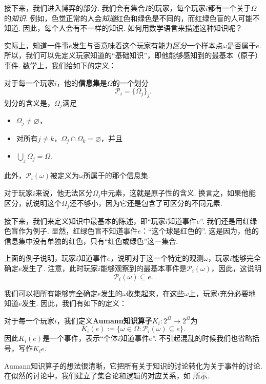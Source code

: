 接下来，我们进入博弈的部分. 我们会有集合$I$的玩家，每个玩家$i$都有一个关于$\Omega$的\textit{知识}. 例如，色觉正常的人会\textit{知道}红色和绿色是不同的，而红绿色盲的人可能不知道. 因此，每个人会有不一样的知识. 如何用数学语言来描述这种知识呢？

实际上，知道一件事$e$发生与否意味着这个玩家有能力\textit{区分}一个样本点$\omega$是否属于$e$. 所以，我们可以先定义玩家知道的“基础知识”，即他能够感知到的最基本（原子）事件. 数学上，我们给如下的定义：

\begin{definition}[信息集]
    对于每一个玩家$i$，他的\textbf{信息集}是$\Omega$的一个划分
    \[\mathcal P_i = \{\Omega_j\}_j.\]
    划分的含义是，$\Omega_j$满足
    \begin{itemize}
        \item $\Omega_j\neq \varnothing$，
        \item 对所有$j\neq k$，$\Omega_j\cap\Omega_k=\varnothing$，并且
        \item $\bigcup_j\Omega_j=\Omega$.
    \end{itemize}
    此外，$\mathcal P_i(\omega)$被定义为$\omega$所属于的那个信息集.
\end{definition}

对于玩家$i$来说，他无法区分$\Omega_j$中元素，这就是原子性的含义. 换言之，如果他能区分，就说明这个$\Omega_j$还不够小，因为它还是包含了可区分的不同元素. 

接下来，我们来定义知识中最基本的陈述，即“玩家$i$知道事件$e$”. 我们还是用红绿色盲作为例子. 显然，红绿色盲不知道事件$e$：“这个球是红色的”. 这是因为，他的信息集中没有单独的红色，只有“红色或绿色”这一集合. 

上面的例子说明，玩家$i$知道事件$e$，说明对于这一个特定的观测$\omega$，玩家$i$能够完全确定$e$发生了. 注意，此时玩家$i$能够观察到的最基本事件是$\mathcal P_i(\omega)$，因此，这说明
\[\mathcal P_i(\omega)\subseteq e.\]

我们可以把所有能够完全确定$e$发生的$\omega$收集起来，在这些$\omega$上，玩家$i$充分必要地知道$e$发生. 因此，我们有如下的定义：

\begin{definition}[Aumann知识算子]
    对于每一个玩家$i$，我们定义\textbf{Aumann知识算子}$K_i:2^\Omega\to 2^\Omega$为
    \[K_i(e):=\{\omega\in\Omega:\mathcal P_i(\omega)\subseteq e\}.\]
    因此$K_i(e)$是一个事件，表示“个体$i$知道事件$e$”. 不引起混乱的时候我们也省略括号，写作$K_ie$.
\end{definition}

Aumann知识算子的想法很清晰，它把所有关于知识的讨论转化为关于事件的讨论. 在似然的讨论中，我们建立了集合论和逻辑的对应关系，如 所示.


